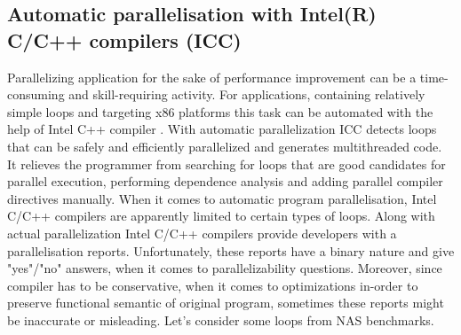 \subsection{Automatic parallelisation with Intel(R) C/C++ compilers (ICC)}
\qquad Parallelizing application for the sake of performance improvement can be a time-consuming and skill-requiring activity. For applications, containing relatively simple loops and targeting x86 platforms this task can be automated with the help of Intel C++ compiler \cite{intel-multithreading-guide}. With automatic parallelization ICC detects loops that can be safely and efficiently parallelized and generates multithreaded code. It relieves the programmer from searching for loops that are good candidates for parallel execution, performing dependence analysis and adding parallel compiler directives manually.\newline 
\null\qquad When it comes to automatic program parallelisation, Intel C/C++ compilers are apparently limited to certain types of loops. \newline \null\qquad Along with actual parallelization Intel C/C++ compilers provide developers with a parallelisation reports. Unfortunately, these reports have a binary nature and give "yes"/"no" answers, when it comes to parallelizability questions. Moreover, since compiler has to be conservative, when it comes to optimizations in-order to preserve functional semantic of original program, sometimes these reports might be inaccurate or misleading. Let's consider some loops from NAS benchmarks.\newline

